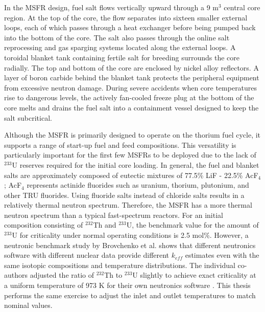 In the \gls{MSFR} design, fuel salt flows vertically upward through a 9 m$^3$
central core region. At the top of the core, the flow separates into sixteen
smaller external loops, each of which passes through a heat exchanger before
being pumped back into the bottom of the core. The salt also passes through
the online salt reprocessing and gas sparging systems located along the
external loops. A toroidal blanket tank containing fertile salt for breeding
surrounds the core radially. The top and bottom of the core are enclosed
by nickel alloy reflectors. A layer of boron carbide behind the blanket tank
protects the peripheral equipment from excessive neutron damage. During severe
accidents when core temperatures rise to dangerous levels, the actively
fan-cooled freeze plug at the bottom of the core melts and drains the fuel
salt into a containment vessel designed to keep the salt subcritical. 

Although the \gls{MSFR} is primarily designed to operate on the thorium fuel
cycle, it supports a range of start-up fuel and feed compositions. This
versatility is particularly important for the first few \glspl{MSFR} to be
deployed due to the lack of $^{233}$U reserves required for the initial core
loading. In general, the fuel and blanket salts are approximately composed of
eutectic mixtures of 77.5\% LiF - 22.5\% AcF$_4$; AcF$_4$ represents
actinide fluorides such as uranium, thorium, plutonium, and other \gls{TRU}
fluorides. Using fluoride salts instead of chloride salts results in a
relatively thermal neutron spectrum. Therefore, the \gls{MSFR} has a more
thermal neutron spectrum than a typical fast-spectrum reactors. For an initial
composition consisting of $^{232}$Th and $^{233}$U,
the benchmark value for the amount of $^{233}$U for criticality under
normal operating conditions is 2.5 mol\%. However, a neutronic benchmark
study by Brovchenko et al. \cite{brovchenko_neutronic_2019} shows that
different neutronics software with different nuclear data provide
different $k_{eff}$ estimates even with the same isotopic compositions and
temperature distributions. The individual co-authors adjusted the
ratio of $^{232}$Th to $^{233}$U slightly to achieve exact criticality at a
uniform temperature of 973 K for their own neutronics software
\cite{brovchenko_neutronic_2019}. This thesis
performs the same exercise to adjust the inlet and outlet temperatures to
match nominal values.

